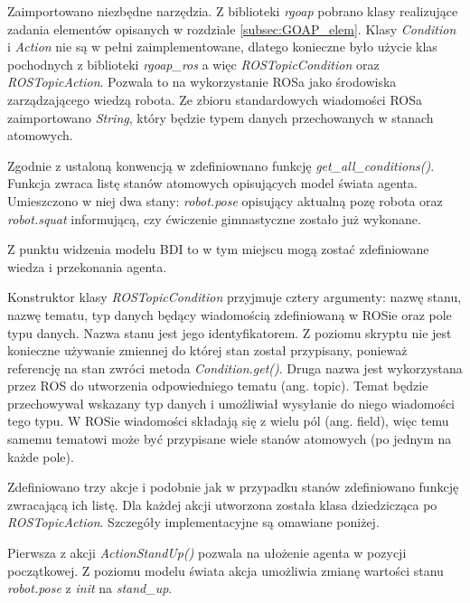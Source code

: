 

Zaimportowano niezbędne narzędzia. Z biblioteki \textit{rgoap} pobrano klasy realizujące zadania elementów opisanych w rozdziale \ref{subsec:GOAP_elem}. Klasy \textit{Condition} i \textit{Action} nie są w pełni zaimplementowane, dlatego konieczne było użycie klas pochodnych z biblioteki \textit{rgoap\_ros} a więc \textit{ROSTopicCondition} oraz \textit{ROSTopicAction}. Pozwala to na wykorzystanie ROSa jako środowiska zarządzającego wiedzą robota. Ze zbioru standardowych wiadomości ROSa zaimportowano \textit{String}, który będzie typem danych przechowanych w stanach atomowych.



Zgodnie z ustaloną konwencją w zdefiniownano funkcję \textit{get\_all\_conditions()}. Funkcja zwraca listę stanów atomowych opisujących model świata agenta. Umieszczono w niej dwa stany: \textit{robot.pose} opisujący aktualną pozę robota oraz \textit{robot.squat} informującą, czy ćwiczenie gimnastyczne zostało już wykonane.

Z punktu widzenia modelu BDI to w tym miejscu mogą zostać zdefiniowane wiedza i przekonania agenta. 

Konstruktor klasy \textit{ROSTopicCondition} przyjmuje cztery argumenty: nazwę stanu, nazwę tematu, typ danych będący wiadomością zdefiniowaną w ROSie oraz pole typu danych.
Nazwa stanu jest jego identyfikatorem. Z poziomu skryptu nie jest konieczne używanie zmiennej do której stan został przypisany, ponieważ referencję na stan zwróci metoda \textit{Condition.get()}. Druga nazwa jest wykorzystana przez ROS do utworzenia odpowiedniego tematu (ang. topic). Temat będzie przechowywał wskazany typ danych i umożliwiał wysyłanie do niego wiadomości tego typu. W ROSie wiadomości składają się z wielu pól (ang. field), więc temu samemu tematowi może być przypisane wiele stanów atomowych (po jednym na każde pole).  


Zdefiniowano trzy akcje i podobnie jak w przypadku stanów zdefiniowano funkcję zwracającą ich listę. Dla każdej akcji utworzona została klasa dziedzicząca po \textit{ROSTopicAction}. Szczegóły implementacyjne są omawiane poniżej. 

Pierwsza z akcji \textit{ActionStandUp()} pozwala na ułożenie agenta w pozycji początkowej. Z poziomu modelu świata akcja umożliwia zmianę wartości stanu \textit{robot.pose} z \textit{init} na \textit{stand\_up}. 

